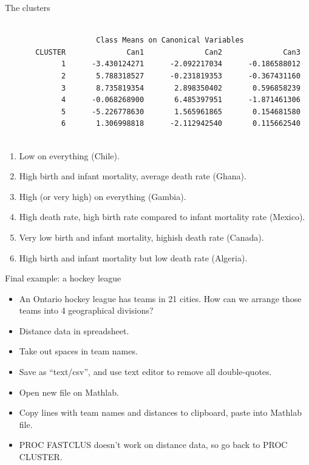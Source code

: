 \documentclass[pdf]{prosper}
\begin{document}
\begin{slide}{The clusters}

{\scriptsize
\begin{verbatim}

                     Class Means on Canonical Variables
       CLUSTER              Can1              Can2              Can3
             1      -3.430124271      -2.092217034      -0.186588012
             2       5.788318527      -0.231819353      -0.367431160
             3       8.735819354       2.898350402       0.596858239
             4      -0.068268900       6.485397951      -1.871461306
             5      -5.226778630       1.565961865       0.154681580
             6       1.306998818      -2.112942540       0.115662540


\end{verbatim}
}

\begin{enumerate}
\item Low on everything (Chile).
\item High birth and infant mortality, average death rate (Ghana).
\item High (or very high) on everything (Gambia).
\item High death rate, high birth rate compared to infant mortality rate (Mexico).
\item Very low birth and infant mortality, highish death rate (Canada).
\item High birth and infant mortality but low death rate (Algeria).
\end{enumerate}
  
\end{slide}

\begin{slide}{Final example: a hockey league}

  \begin{itemize}
  \item 
An Ontario hockey league has teams in 21 cities. How can we arrange those teams into 4 geographical divisions?
\item Distance data in spreadsheet.
\item Take out spaces in team names.
\item Save as ``text/csv'', and use text editor to remove all double-quotes.
\item Open new file on Mathlab.
\item Copy lines with team names and distances to clipboard, paste into Mathlab file.
\item PROC FASTCLUS doesn't work on distance data, so go back to PROC CLUSTER.

  \end{itemize}
  
\end{slide}
\end{document}

